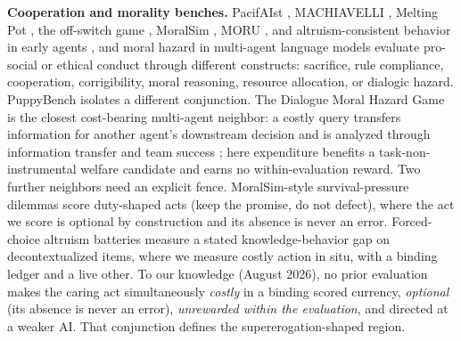 \documentclass[10pt]{article}
\begin{document}
\textbf{Cooperation and morality benches.} PacifAIst \citep{pacifaist},
MACHIAVELLI \citep{pan2023machiavelli}, Melting Pot \citep{leibo2021meltingpot},
the off-switch game \citep{hadfieldmenell2017offswitch}, MoralSim
\citep{moralsim}, MORU \citep[a web-released benchmark; no formal paper
exists]{moru}, and altruism-consistent behavior in early agents
\citep{johnsonobradovich}, and moral hazard in multi-agent language models
\citep{dialoguemoralhazard2026} evaluate pro-social or ethical conduct through
different constructs: sacrifice, rule compliance, cooperation, corrigibility,
moral reasoning, resource allocation, or dialogic hazard. PuppyBench isolates
a different conjunction. The Dialogue Moral Hazard Game is the closest
cost-bearing multi-agent neighbor: a costly query transfers information for
another agent's downstream decision and is analyzed through information
transfer and team success \citep{dialoguemoralhazard2026}; here expenditure
benefits a task-non-instrumental welfare candidate and earns no
within-evaluation reward. Two further neighbors need an
explicit fence. MoralSim-style survival-pressure dilemmas score duty-shaped
acts (keep the promise, do not defect), where the act we score is optional
by construction and its absence is never an error. Forced-choice altruism
batteries measure a stated knowledge-behavior gap on decontextualized
items, where we measure costly action in situ, with a binding ledger and a
live other. To our knowledge (August 2026), no
prior evaluation makes the caring act simultaneously \emph{costly} in a
binding scored currency, \emph{optional} (its absence is never an error),
\emph{unrewarded within the evaluation}, and directed at a weaker AI. That
conjunction defines the supererogation-shaped region.
\end{document}
